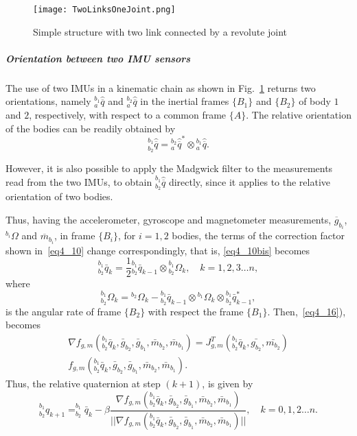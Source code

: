 \begin{figure}[t]
\centering
\texttt{[image: TwoLinksOneJoint.png]}
\caption{Simple structure with two link connected by a revolute joint}
\label{TwoLinksOneJoint}
\end{figure}

\subparagraph{Orientation between two IMU sensors}

The use of two IMUs in a kinematic chain as shown in Fig.~\ref{TwoLinksOneJoint} returns two orientations, namely $^{b{_1}}_a \hat{\overline{q}}$ and $^{b{_2}}_a \hat{\overline{q}}$ in the inertial frames $\{ B_1 \}$ and $\{ B_2 \}$ of body $1$ and $2$, respectively, with respect to a common frame $\{ A \}$. The relative orientation of the bodies can be readily obtained by
\begin{equation}
\label{eq4_18}
{^{b_1}_{b_2}\hat{\overline{q}}} = {_{a}^{b_2}\hat{\overline{q}}^{*}} \otimes {_{a}^{b_1}\hat{\overline{q}}}.
\end{equation}

However, it is also possible to apply the Madgwick filter to the measurements read from the two IMUs, to obtain ${^{b_1}_{b_2}\hat{\overline{q}}}$ directly, since it applies to the relative orientation of two bodies.

Thus, having the accelerometer, gyroscope and magnetometer measurements, $\overline{g}_{b_i}$, $^{b_i} \Omega$ and $\overline{m}_{b_i}$, in frame $\{ B_i \}$, for $i=1,2$ bodies, the terms of the correction factor shown in~\eqref{eq4_10} change correspondingly, that is, \eqref{eq4_10bis} becomes
\begin{equation}
\label{eq4_19}
^{b_1}_{b_2} \bar{q}_k = \frac{1}{2} {^{b_1}_{b_2} \bar{q}_{k-1}} \otimes {^{b_1}_{b_2} \Omega_k},  \quad k = 1,2,3 \dots n,
\end{equation}
where
\begin{equation}
\label{eq4_20}
{^{b_1}_{b_2} \Omega_k} = {^{b_2} \Omega_k} - {^{b_1}_{b_2} \bar{q}_{k-1}} \otimes {^{b_1} \Omega_k} \otimes {^{b_1}_{b_2} \bar{q}^{*}_{k-1}},
\end{equation}
is the angular rate of frame $\{ B_2 \}$ with respect the frame $\{ B_1 \}$. Then,~\eqref{eq4_16}), becomes
\begin{equation}
\begin{split}
\label{eq4_21}
\nabla f_{g,m}(^{b_1}_{b_2} \bar{q}_k,\bar{g}_{b_2},\bar{g}_{b_1},\bar{m}_{b_2},\bar{m}_{b_1}) = J_{g,m}^T(^{b_1}_{b_2} \bar{q}_k, \bar{g_{b_2}},\bar{m_{b_2}}) \\ {f}_{g,m}(^{b_1}_{b_2} \bar{q}_k,\bar{g}_{b_2},\bar{g}_{b_1},\bar{m}_{b_2},\bar{m}_{b_1}).
\end{split}
\end{equation}
Thus, the relative quaternion at step $(k+1)$, is given by
\begin{equation}
\label{eq4_22}
^{b_1}_{b_2} q_{k+1} = ^{b_1}_{b_2} \bar{q}_k - \beta \frac{\nabla f_{g,m}(^{b_1}_{b_2} \bar{q}_k,\bar{g}_{b_2},\bar{g}_{b_1},\bar{m}_{b_2},\bar{m}_{b_1}) }{\vert \vert \nabla f_{g,m}(^{b_1}_{b_2} \bar{q}_k,\bar{g}_{b_2},\bar{g}_{b_1},\bar{m}_{b_2},\bar{m}_{b_1})  \vert \vert}, \quad k = 0,1,2 \dots n.
\end{equation}

